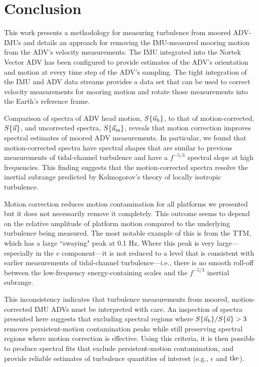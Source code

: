 
\section{Conclusion}
\label{sec:conclusion}
 
This work presents a methodology for measuring turbulence from moored ADV-IMUs and details an approach for removing the IMU-measured mooring motion from the ADV's velocity measurements. The IMU integrated into the Nortek Vector ADV has been configured to provide estimates of the ADV's orientation and motion at every time step of the ADV's sampling. The tight integration of the IMU and ADV data streams provides a data set that can be used to correct velocity measurements for mooring motion and rotate those measurements into the Earth's reference frame. 

Comparison of spectra of ADV head motion, $S\{\vec{u}_\mathrm{h}\}$, to that of motion-corrected, $S\{\vec{u}\}$, and uncorrected spectra, $S\{\vec{u}_\mathrm{m}\}$, reveals that motion correction improves spectral estimates of moored ADV measurements. In particular, we found that motion-corrected spectra have spectral shapes that are similar to previous measurements of tidal-channel turbulence and have a $f^{-5/3}$ spectral slope at high frequencies. This finding suggests that the motion-corrected spectra resolve the inertial subrange predicted by Kolmogorov's theory of locally isotropic turbulence.

Motion correction reduces motion contamination for all platforms we presented but it does not necessarily remove it completely. This outcome seems to depend on the relative amplitude of platform motion compared to the underlying turbulence being measured. The most notable example of this is from the TTM, which has a large ``swaying" peak at 0.1 Hz. Where this peak is very large---especially in the $v$ component---it is not reduced to a level that is consistent with earlier measurements of tidal-channel turbulence---i.e., there is no smooth roll-off between the low-frequency energy-containing scales and the $f^{-5/3}$ inertial subrange.

This inconsistency indicates that turbulence measurements from moored, motion-corrected IMU ADVs must be interpreted with care. An inspection of spectra presented here suggests that excluding spectral regions where $S\{\vec{u}_\mathrm{h}\} / S\{\vec{u}\} > 3$ removes persistent-motion contamination peaks while still preserving spectral regions where motion correction is effective. Using this criteria, it is then possible to produce spectral fits that exclude persistent-motion contamination, and provide reliable estimates of turbulence quantities of interest (e.g., $\epsilon$ and $\mathrm{tke}$).


